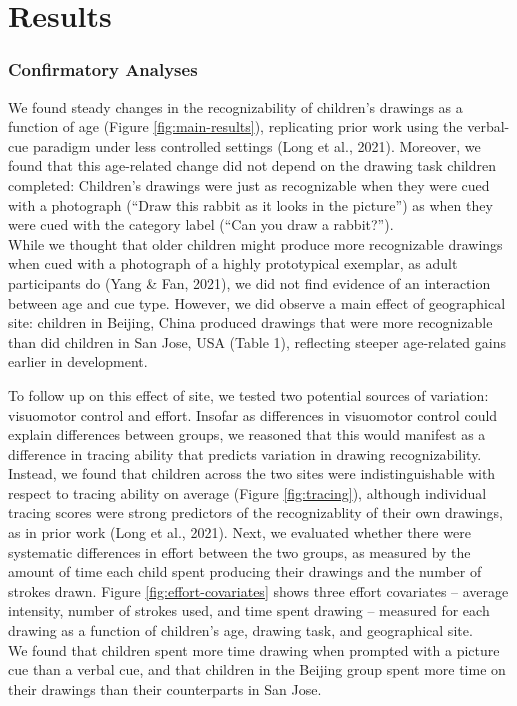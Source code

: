 \documentclass[
  english,
  man]{apa6}
\begin{document}
\hypertarget{results}{%
\section{Results}\label{results}}

\hypertarget{confirmatory-analyses}{%
\subsubsection{Confirmatory Analyses}\label{confirmatory-analyses}}

We found steady changes in the recognizability of children's drawings as a function of age (Figure \ref{fig:main-results}), replicating prior work using the verbal-cue paradigm under less controlled settings (Long et al., 2021).
Moreover, we found that this age-related change did not depend on the drawing task children completed: Children's drawings were just as recognizable when they were cued with a photograph (\enquote{Draw this rabbit as it looks in the picture}) as when they were cued with the category label (\enquote{Can you draw a rabbit?}).\\
While we thought that older children might produce more recognizable drawings when cued with a photograph of a highly prototypical exemplar, as adult participants do (Yang \& Fan, 2021), we did not find evidence of an interaction between age and cue type.
However, we did observe a main effect of geographical site: children in Beijing, China produced drawings that were more recognizable than did children in San Jose, USA (Table 1), reflecting steeper age-related gains earlier in development.

To follow up on this effect of site, we tested two potential sources of variation: visuomotor control and effort.
Insofar as differences in visuomotor control could explain differences between groups, we reasoned that this would manifest as a difference in tracing ability that predicts variation in drawing recognizability.
Instead, we found that children across the two sites were indistinguishable with respect to tracing ability on average (Figure \ref{fig:tracing}), although individual tracing scores were strong predictors of the recognizablity of their own drawings, as in prior work (Long et al., 2021).
Next, we evaluated whether there were systematic differences in effort between the two groups, as measured by the amount of time each child spent producing their drawings and the number of strokes drawn.
Figure \ref{fig:effort-covariates} shows three effort covariates -- average intensity, number of strokes used, and time spent drawing -- measured for each drawing as a function of children's age, drawing task, and geographical site.\\
We found that children spent more time drawing when prompted with a picture cue than a verbal cue, and that children in the Beijing group spent more time on their drawings than their counterparts in San Jose.
\end{document}
